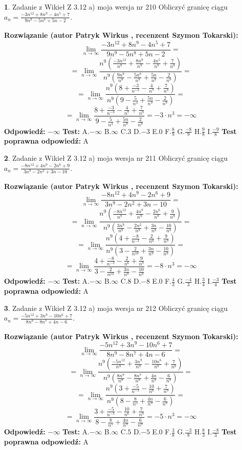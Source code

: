 \documentclass[12pt, a4paper]{article}
\theoremstyle{definition} %
\newtheorem{zad}{}
\newcommand{\zadStart}[1]{\begin{zad}#1\newline}
\newcommand{\zadStop}{\end{zad}}
\newcommand{\rozwStart}[2]{\noindent \textbf{Rozwiązanie (autor #1 , recenzent #2): }\newline}
\newcommand{\rozwStop}{\newline}
\newcommand{\odpStart}{\noindent \textbf{Odpowiedź:}\newline}
\newcommand{\odpStop}{\newline}
\newcommand{\testStart}{\noindent \textbf{Test:}\newline}
\newcommand{\testStop}{\newline}
\newcommand{\kluczStart}{\noindent \textbf{Test poprawna odpowiedź:}\newline}
\newcommand{\kluczStop}{\newline}
\begin{document}
\zadStart{Zadanie z Wikieł Z 3.12 a) moja wersja nr 210}
Obliczyć granicę ciągu $a_{n}=\frac{-3n^{12}+8n^{9}-4n^{5}+7}{9n^{9}-5n^{8}+5n-2}$.
\zadStop
\rozwStart{Patryk Wirkus}{Szymon Tokarski}
$$\lim\limits_{n\to\infty}\frac{-3n^{12}+8n^{9}-4n^{5}+7}{9n^{9}-5n^{8}+5n-2}=$$
$$=\lim\limits_{n\to\infty}\frac{n^{9}\left(\frac{-3n^{12}}{n^{9}}+\frac{8n^{9}}{n^{9}}-\frac{4n^{5}}{n^{9}}+\frac{7}{n^{9}}\right)}{n^{9}\left(\frac{9n^{9}}{n^{9}}-\frac{5n^{8}}{n^{9}}+\frac{5n}{n^{9}}-\frac{2}{n^{9}}\right)}=$$
$$=\lim\limits_{n\to\infty}\frac{n^{9}\left(8+\frac{-3}{n^{-3}}-\frac{4}{n^{7}}+\frac{7}{n^{9}}\right)}
{n^{9}\left(9-\frac{5}{n^{4}}+\frac{5n}{n^{9}}-\frac{2}{n^{9}}\right)}=$$
$$=\lim\limits_{n\to\infty}\frac{8+\frac{-3}{n^{-3}}-\frac{4}{n^{7}}+\frac{7}{n^{9}}}{9-\frac{5}{n^{4}}+\frac{5n}{n^{9}}-\frac{2}{n^{9}}}=-3\cdot n^{3} = -\infty$$
\rozwStop
\odpStart
$-\infty$
\odpStop
\testStart
A.$-\infty$
B.$\infty$
C.$3$
D.$-3$
E.$0$
F.$\frac{8}{9}$
G.$\frac{-8}{9}$
H.$\frac{9}{8}$
I.$\frac{-9}{8}$
\testStop
\kluczStart
A
\kluczStop



\zadStart{Zadanie z Wikieł Z 3.12 a) moja wersja nr 211}
Obliczyć granicę ciągu $a_{n}=\frac{-8n^{12}+4n^{9}-2n^{6}+9}{3n^{9}-2n^{2}+3n-10}$.
\zadStop
\rozwStart{Patryk Wirkus}{Szymon Tokarski}
$$\lim\limits_{n\to\infty}\frac{-8n^{12}+4n^{9}-2n^{6}+9}{3n^{9}-2n^{2}+3n-10}=$$
$$=\lim\limits_{n\to\infty}\frac{n^{9}\left(\frac{-8n^{12}}{n^{9}}+\frac{4n^{9}}{n^{9}}-\frac{2n^{6}}{n^{9}}+\frac{9}{n^{9}}\right)}{n^{9}\left(\frac{3n^{9}}{n^{9}}-\frac{2n^{2}}{n^{9}}+\frac{3n}{n^{9}}-\frac{10}{n^{9}}\right)}=$$
$$=\lim\limits_{n\to\infty}\frac{n^{9}\left(4+\frac{-8}{n^{-3}}-\frac{2}{n^{6}}+\frac{9}{n^{9}}\right)}
{n^{9}\left(3-\frac{2}{n^{10}}+\frac{3n}{n^{9}}-\frac{10}{n^{9}}\right)}=$$
$$=\lim\limits_{n\to\infty}\frac{4+\frac{-8}{n^{-3}}-\frac{2}{n^{6}}+\frac{9}{n^{9}}}{3-\frac{2}{n^{10}}+\frac{3n}{n^{9}}-\frac{10}{n^{9}}}=-8\cdot n^{3} = -\infty$$
\rozwStop
\odpStart
$-\infty$
\odpStop
\testStart
A.$-\infty$
B.$\infty$
C.$8$
D.$-8$
E.$0$
F.$\frac{4}{3}$
G.$\frac{-4}{3}$
H.$\frac{3}{4}$
I.$\frac{-3}{4}$
\testStop
\kluczStart
A
\kluczStop



\zadStart{Zadanie z Wikieł Z 3.12 a) moja wersja nr 212}
Obliczyć granicę ciągu $a_{n}=\frac{-5n^{12}+3n^{9}-10n^{6}+7}{8n^{9}-8n^{7}+4n-6}$.
\zadStop
\rozwStart{Patryk Wirkus}{Szymon Tokarski}
$$\lim\limits_{n\to\infty}\frac{-5n^{12}+3n^{9}-10n^{6}+7}{8n^{9}-8n^{7}+4n-6}=$$
$$=\lim\limits_{n\to\infty}\frac{n^{9}\left(\frac{-5n^{12}}{n^{9}}+\frac{3n^{9}}{n^{9}}-\frac{10n^{6}}{n^{9}}+\frac{7}{n^{9}}\right)}{n^{9}\left(\frac{8n^{9}}{n^{9}}-\frac{8n^{7}}{n^{9}}+\frac{4n}{n^{9}}-\frac{6}{n^{9}}\right)}=$$
$$=\lim\limits_{n\to\infty}\frac{n^{9}\left(3+\frac{-5}{n^{-3}}-\frac{10}{n^{6}}+\frac{7}{n^{9}}\right)}
{n^{9}\left(8-\frac{8}{n^{5}}+\frac{4n}{n^{9}}-\frac{6}{n^{9}}\right)}=$$
$$=\lim\limits_{n\to\infty}\frac{3+\frac{-5}{n^{-3}}-\frac{10}{n^{6}}+\frac{7}{n^{9}}}{8-\frac{8}{n^{5}}+\frac{4n}{n^{9}}-\frac{6}{n^{9}}}=-5\cdot n^{3} = -\infty$$
\rozwStop
\odpStart
$-\infty$
\odpStop
\testStart
A.$-\infty$
B.$\infty$
C.$5$
D.$-5$
E.$0$
F.$\frac{3}{8}$
G.$\frac{-3}{8}$
H.$\frac{8}{3}$
I.$\frac{-8}{3}$
\testStop
\kluczStart
A
\kluczStop
\end{document}
